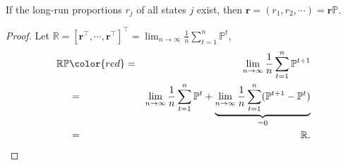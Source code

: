 \begin{lemma} \label{lem:r-eq-rp}
If the long-run proportions $ r_{j} $ of all states $ j $ exist, then $ \mathbf{r} = (r_{1}, r_{2}, \cdots) = \mathbf{r}\mathbb{P} $.

\begin{proof}
Let $ \mathbb{R} = [\mathbf{r}^{\intercal}, \cdots, \mathbf{r}^{\intercal}]^{\intercal} = \lim_{n \to \infty} \frac{1}{n} \sum_{t = 1}^{n} \mathbb{P}^{t} $,
\begin{eqnarray*}
\mathbb{R}\mathbb{P}
  & {\color{red} =} & \lim_{n \to \infty} \frac{1}{n} \sum_{t = 1}^{n} \mathbb{P}^{t + 1} \\
  & = & \lim_{n \to \infty} \frac{1}{n} \sum_{t = 1}^{n} \mathbb{P}^{t}
      + \underbrace{\lim_{n \to \infty} \frac{1}{n} \sum_{t = 1}^{n} (\mathbb{P}^{t + 1} - \mathbb{P}^{t})}_{= 0} \\
  & = & \mathbb{R}.
\end{eqnarray*}
\end{proof}

\begin{comment}
\begin{eqnarray*}
(\mathbb{R}\mathbb{P})[i, j]
  & = & \sum_{k \in \mathcal{S}} r_{k} \cdot \mathbb{P}[k, j] \\
  & = & \sum_{k \in \mathcal{S}} \lim_{n \to \infty} \frac{1}{n} \sum_{t = 1}^{n} \mathbb{P}^{t}[i, k] \cdot \mathbb{P}[k, j] \\
  & = & \lim_{m \to \infty} \lim_{n \to \infty} \frac{1}{n} \sum_{t = 1}^{n} \sum_{k = 1}^{m} \mathbb{P}^{t}[i, k] \cdot \mathbb{P}[k, j] \\
  & \le & \lim_{m \to \infty} \lim_{n \to \infty} \frac{1}{n} \sum_{t = 1}^{n} \sum_{k \in \mathcal{S}} \mathbb{P}^{t}[i, k] \cdot \mathbb{P}[k, j] \\
  & = & \lim_{m \to \infty} \lim_{n \to \infty} \frac{1}{n} \sum_{t = 1}^{n} \mathbb{P}^{t + 1}[i, j] \\
  & = & \lim_{n \to \infty} \frac{1}{n} \sum_{t = 1}^{n} \mathbb{P}^{t + 1}[i, j],
\end{eqnarray*}


\end{comment}
\end{lemma}
